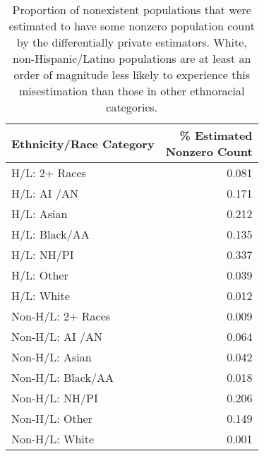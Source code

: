 \begin{table}[ht]
\centering
\begin{tabular}{l|r}
 Ethnicity/Race Category & \thead{\% Estimated \\ Nonzero Count} \\ 
  \hline
  H/L: 2+ Races & 0.081 \\ 
  H/L: AI /AN & 0.171 \\ 
  H/L: Asian & 0.212 \\ 
  H/L: Black/AA & 0.135 \\ 
  H/L: NH/PI & 0.337 \\ 
  H/L: Other & 0.039 \\ 
  H/L: White & 0.012 \\ 
   \hline
  Non-H/L: 2+ Races & 0.009 \\ 
  Non-H/L: AI /AN & 0.064 \\ 
  Non-H/L: Asian & 0.042 \\ 
  Non-H/L: Black/AA & 0.018 \\ 
  Non-H/L: NH/PI & 0.206 \\ 
  Non-H/L: Other & 0.149 \\ 
  Non-H/L: White & 0.001 \\ 
  \end{tabular}
  \caption{Proportion of nonexistent populations that were estimated to have some nonzero population count by the differentially private estimators. White, non-Hispanic/Latino populations are at least an order of magnitude less likely to experience this misestimation than those in other ethnoracial categories.}
  \label{tab:nonzero-by}
\end{table}
